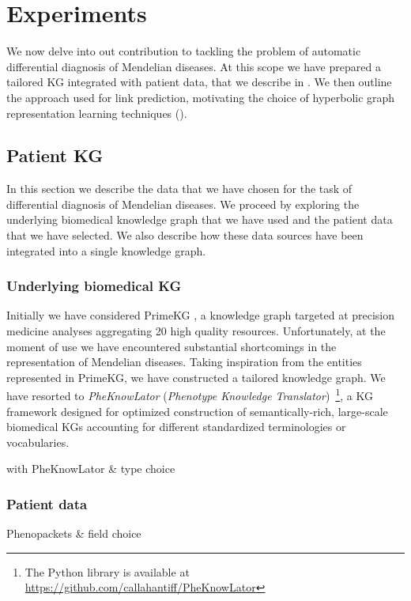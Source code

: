\chapter{Experiments}
We now delve into out contribution to tackling the problem of automatic differential diagnosis of Mendelian diseases. At this scope we have prepared a tailored KG integrated with patient data, that we describe in . We then outline the approach used for link prediction, motivating the choice of hyperbolic graph representation learning techniques (). 

\section{Patient KG}\label{sec:patientKG}
In this section we describe the data that we have chosen for the task of differential diagnosis of Mendelian diseases. We proceed by exploring the underlying biomedical knowledge graph that we have used and the patient data that we have selected. We also describe how these data sources have been integrated into a single knowledge graph.

\subsection{Underlying biomedical KG}
Initially we have considered PrimeKG \cite{chandak2023PrimeKG}, a knowledge graph targeted at precision medicine analyses aggregating 20 high quality resources. Unfortunately, at the moment of use we have encountered substantial shortcomings in the representation of Mendelian diseases. Taking inspiration from the entities represented in PrimeKG, we have constructed a tailored knowledge graph. We have resorted to \emph{PheKnowLator} (\emph{Phenotype Knowledge Translator})~\cite{callahan2020PheKnowlator}\footnote{The Python library is available at \url{https://github.com/callahantiff/PheKnowLator}}, a KG framework designed for optimized construction of semantically-rich, large-scale biomedical KGs accounting for different standardized terminologies or vocabularies. 




with PheKnowLator \& type choice



\subsection{Patient data}
Phenopackets \& field choice

